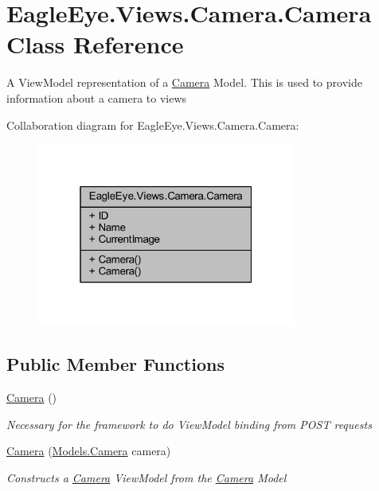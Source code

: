 \hypertarget{class_eagle_eye_1_1_views_1_1_camera_1_1_camera}{}\section{Eagle\+Eye.\+Views.\+Camera.\+Camera Class Reference}
\label{class_eagle_eye_1_1_views_1_1_camera_1_1_camera}


A View\+Model representation of a \mbox{\hyperlink{class_eagle_eye_1_1_views_1_1_camera_1_1_camera}{Camera}} Model. This is used to provide information about a camera to views  




Collaboration diagram for Eagle\+Eye.\+Views.\+Camera.\+Camera\+:
\nopagebreak
\begin{figure}[H]
\begin{center}
\leavevmode
\includegraphics[width=241pt]{class_eagle_eye_1_1_views_1_1_camera_1_1_camera__coll__graph}
\end{center}
\end{figure}
\subsection*{Public Member Functions}
\begin{DoxyCompactItemize}
\item 
\mbox{\hyperlink{class_eagle_eye_1_1_views_1_1_camera_1_1_camera_ab3ccc315a6ac49b823bcb2985f20ec0b}{Camera}} ()
\begin{DoxyCompactList}\small\item\em Necessary for the framework to do View\+Model binding from P\+O\+ST requests \end{DoxyCompactList}\item 
\mbox{\hyperlink{class_eagle_eye_1_1_views_1_1_camera_1_1_camera_a346c5d9185abc85856b4fba46edaf101}{Camera}} (\mbox{\hyperlink{class_eagle_eye_1_1_models_1_1_camera}{Models.\+Camera}} camera)
\begin{DoxyCompactList}\small\item\em Constructs a \mbox{\hyperlink{class_eagle_eye_1_1_views_1_1_camera_1_1_camera}{Camera}} View\+Model from the \mbox{\hyperlink{class_eagle_eye_1_1_views_1_1_camera_1_1_camera}{Camera}} Model \end{DoxyCompactList}\end{DoxyCompactItemize}
